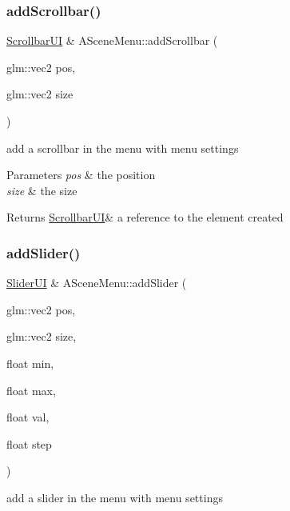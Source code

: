 \subsubsection{\texorpdfstring{add\+Scrollbar()}{addScrollbar()}}
{\footnotesize\ttfamily \hyperlink{class_scrollbar_u_i}{Scrollbar\+UI} \& A\+Scene\+Menu\+::add\+Scrollbar (\begin{DoxyParamCaption}\item[{glm\+::vec2}]{pos,  }\item[{glm\+::vec2}]{size }\end{DoxyParamCaption})}



add a scrollbar in the menu with menu settings 


\begin{DoxyParams}{Parameters}
{\em pos} & the position \\
\hline
{\em size} & the size \\
\hline
\end{DoxyParams}
\begin{DoxyReturn}{Returns}
\hyperlink{class_scrollbar_u_i}{Scrollbar\+UI}\& a reference to the element created 
\end{DoxyReturn}
\mbox{\label{class_a_scene_menu_ad526697a433c9f8e627eb6c147a5bd20}} 
\subsubsection{\texorpdfstring{add\+Slider()}{addSlider()}}
{\footnotesize\ttfamily \hyperlink{class_slider_u_i}{Slider\+UI} \& A\+Scene\+Menu\+::add\+Slider (\begin{DoxyParamCaption}\item[{glm\+::vec2}]{pos,  }\item[{glm\+::vec2}]{size,  }\item[{float}]{min,  }\item[{float}]{max,  }\item[{float}]{val,  }\item[{float}]{step }\end{DoxyParamCaption})}



add a slider in the menu with menu settings 


